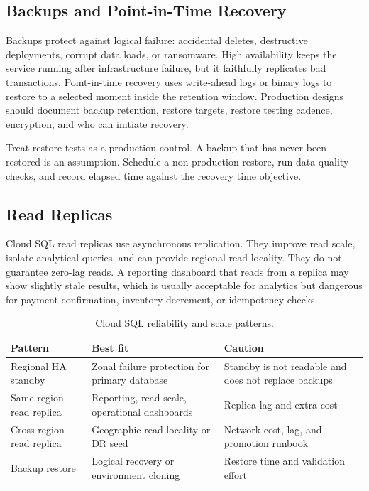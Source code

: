 \subsection{Backups and Point-in-Time Recovery}
Backups protect against logical failure: accidental deletes, destructive deployments, corrupt data loads, or ransomware. High availability keeps the service running after infrastructure failure, but it faithfully replicates bad transactions. Point-in-time recovery uses write-ahead logs or binary logs to restore to a selected moment inside the retention window. Production designs should document backup retention, restore targets, restore testing cadence, encryption, and who can initiate recovery.

\begin{tipbox}
Treat restore tests as a production control. A backup that has never been restored is an assumption. Schedule a non-production restore, run data quality checks, and record elapsed time against the recovery time objective.
\end{tipbox}

\subsection{Read Replicas}
Cloud SQL read replicas use asynchronous replication. They improve read scale, isolate analytical queries, and can provide regional read locality. They do not guarantee zero-lag reads. A reporting dashboard that reads from a replica may show slightly stale results, which is usually acceptable for analytics but dangerous for payment confirmation, inventory decrement, or idempotency checks.

\begin{table}[H]
\centering
\small
\begin{tabular}{@{}p{3.2cm}p{4.8cm}p{4.6cm}@{}}
\toprule
\textbf{Pattern} & \textbf{Best fit} & \textbf{Caution} \\
\midrule
Regional HA standby & Zonal failure protection for primary database & Standby is not readable and does not replace backups \\
Same-region read replica & Reporting, read scale, operational dashboards & Replica lag and extra cost \\
Cross-region read replica & Geographic read locality or DR seed & Network cost, lag, and promotion runbook \\
Backup restore & Logical recovery or environment cloning & Restore time and validation effort \\
\bottomrule
\end{tabular}
\caption{Cloud SQL reliability and scale patterns.}
\label{tab:cloud-sql-reliability-patterns}
\end{table}

